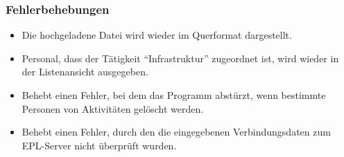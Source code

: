 \subsubsection{Fehlerbehebungen}
\begin{itemize}
  \item
  Die hochgeladene Datei wird wieder im Querformat dargestellt.
  \item
  Personal, dass der Tätigkeit "`Infrastruktur"' zugeordnet ist, wird wieder in der Listenansicht ausgegeben.
  \item
  Behebt einen Fehler, bei dem das Programm abstürzt, wenn bestimmte Personen von Aktivitäten gelöscht werden.
  \item
  Behebt einen Fehler, durch den die eingegebenen Verbindungsdaten zum EPL-Server nicht überprüft wurden.
\end{itemize}
